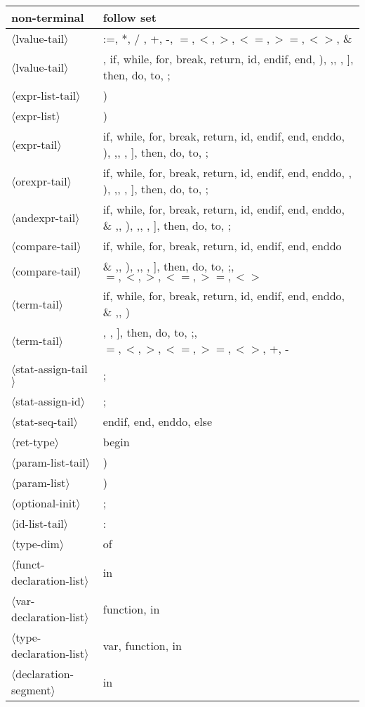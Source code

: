 \documentclass[11pt, fleqn]{article}
\newcommand{\atag}[1]{$\langle$#1$\rangle$}
\begin{document}
\begin{longtable}{l|l}
non-terminal						&	follow set												\\
\hline
\atag{lvalue-tail}				&	:=, *, /	, +, -, $=, <, >, <=, >=, <>$, \& \\
\atag{lvalue-tail}				&	\textbar , if, while, for, break, return, id, endif, end, ), ,, , ], then, do, to, ; 					\\
\atag{expr-list-tail}			&	)												\\
\atag{expr-list}					&	)								\\
\atag{expr-tail}					&	if, while, for, break, return, id, endif, end, enddo, ), ,, , ], then, do, to, ;	\\
\atag{orexpr-tail}				&	if, while, for, break, return, id, endif, end, enddo, \textbar , ), ,, , ], then, do, to, ;	\\
\atag{andexpr-tail}				&	if, while, for, break, return, id, endif, end, enddo, \& ,\textbar , ), ,, , ], then, do, to, ; 	\\
\atag{compare-tail}				&	if, while, for, break, return, id, endif, end, enddo	\\
\atag{compare-tail}				&	\& ,\textbar , ), ,, , ], then, do, to, ;, $=, <, >, <=, >=, <>$	\\
\atag{term-tail}					&	if, while, for, break, return, id, endif, end, enddo, \& ,\textbar , ) \\
\atag{term-tail}					&	, , ], then, do, to, ;, $=, <, >, <=, >=, <>$, +, -	\\
\atag{stat-assign-tail}			&	;	\\
\atag{stat-assign-id}			&	;	\\
\atag{stat-seq-tail}				&	endif, end, enddo, else		\\
\atag{ret-type}					&	begin		\\
\atag{param-list-tail}			&	)	\\
\atag{param-list}				&	)		\\
\atag{optional-init}				&	;		\\
\atag{id-list-tail}				&	:		\\
\atag{type-dim}					&	of	\\
\atag{funct-declaration-list}	&	in	\\
\atag{var-declaration-list}		&	function, in	\\
\atag{type-declaration-list}		&	var, function, in		\\
\atag{declaration-segment}		&	in	\\
\end{longtable}
\end{document}
